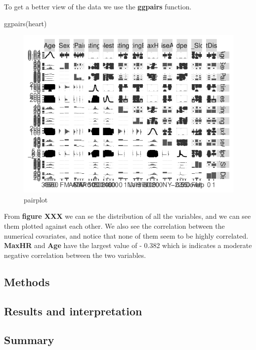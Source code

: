 \documentclass[
]{article}
\newenvironment{Shaded}{\begin{snugshade}}{\end{snugshade}}
\newcommand{\FunctionTok}[1]{\textcolor[rgb]{0.00,0.00,0.00}{#1}}
\newcommand{\NormalTok}[1]{#1}
\begin{document}
To get a better view of the data we use the \textbf{ggpairs} function.

\begin{Shaded}
\begin{Highlighting}[]
\FunctionTok{ggpairs}\NormalTok{(heart)}
\end{Highlighting}
\end{Shaded}

\begin{figure}

{\centering \includegraphics{Main_Text_files/figure-latex/unnamed-chunk-4-1} 

}

\caption{pairplot}\label{fig:unnamed-chunk-4}
\end{figure}

From \textbf{figure XXX} we can se the distribution of all the
variables, and we can see them plotted against each other. We also see
the correlation between the numerical covariates, and notice that none
of them seem to be highly correlated. \textbf{MaxHR} and \textbf{Age}
have the largest value of - 0.382 which is indicates a moderate negative
correlation between the two variables.

\hypertarget{methods}{%
\subsection{Methods}\label{methods}}

\hypertarget{results-and-interpretation}{%
\subsection{Results and
interpretation}\label{results-and-interpretation}}

\hypertarget{summary}{%
\subsection{Summary}\label{summary}}
\end{document}
